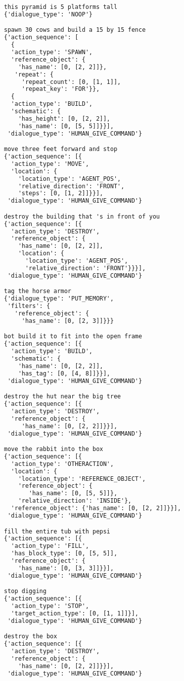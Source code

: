 \begin{lstlisting}[language=TeX]
this pyramid is 5 platforms tall
{'dialogue_type': 'NOOP'}

spawn 30 cows and build a 15 by 15 fence
{'action_sequence': [
  {
  'action_type': 'SPAWN',
  'reference_object': {
    'has_name': [0, [2, 2]]},
   'repeat': {
     'repeat_count': [0, [1, 1]],
     'repeat_key': 'FOR'}},
  {
  'action_type': 'BUILD',
  'schematic': {
    'has_height': [0, [2, 2]],
    'has_name': [0, [5, 5]]}}],
 'dialogue_type': 'HUMAN_GIVE_COMMAND'}

move three feet forward and stop
{'action_sequence': [{
  'action_type': 'MOVE',
  'location': {
    'location_type': 'AGENT_POS',
    'relative_direction': 'FRONT',
    'steps': [0, [1, 2]]}}],
 'dialogue_type': 'HUMAN_GIVE_COMMAND'}

destroy the building that 's in front of you
{'action_sequence': [{
  'action_type': 'DESTROY',
  'reference_object': {
    'has_name': [0, [2, 2]],
    'location': {
      'location_type': 'AGENT_POS',
      'relative_direction': 'FRONT'}}}],
 'dialogue_type': 'HUMAN_GIVE_COMMAND'}

tag the horse armor
{'dialogue_type': 'PUT_MEMORY',
 'filters': {
   'reference_object': {
     'has_name': [0, [2, 3]]}}}

bot build it to fit into the open frame
{'action_sequence': [{
  'action_type': 'BUILD',
  'schematic': {
    'has_name': [0, [2, 2]],
    'has_tag': [0, [4, 8]]}}],
 'dialogue_type': 'HUMAN_GIVE_COMMAND'}

destroy the hut near the big tree
{'action_sequence': [{
  'action_type': 'DESTROY',
  'reference_object': {
     'has_name': [0, [2, 2]]}}],
 'dialogue_type': 'HUMAN_GIVE_COMMAND'}

move the rabbit into the box
{'action_sequence': [{
  'action_type': 'OTHERACTION',
  'location': {
    'location_type': 'REFERENCE_OBJECT',
    'reference_object': {
       'has_name': [0, [5, 5]]},
    'relative_direction': 'INSIDE'},
  'reference_object': {'has_name': [0, [2, 2]]}}],
 'dialogue_type': 'HUMAN_GIVE_COMMAND'}

fill the entire tub with pepsi
{'action_sequence': [{
  'action_type': 'FILL',
  'has_block_type': [0, [5, 5]],
  'reference_object': {
    'has_name': [0, [3, 3]]}}],
 'dialogue_type': 'HUMAN_GIVE_COMMAND'}

stop digging
{'action_sequence': [{
  'action_type': 'STOP',
  'target_action_type': [0, [1, 1]]}],
 'dialogue_type': 'HUMAN_GIVE_COMMAND'}

destroy the box
{'action_sequence': [{
  'action_type': 'DESTROY',
  'reference_object': {
    'has_name': [0, [2, 2]]}}],
 'dialogue_type': 'HUMAN_GIVE_COMMAND'}


\end{lstlisting}
